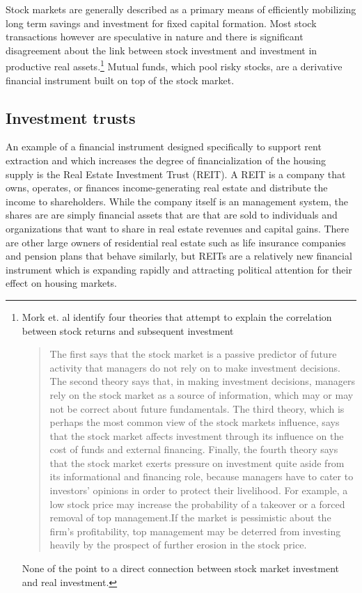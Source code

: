 Stock markets are  generally described as a primary means of efficiently mobilizing long term savings and investment for  fixed capital formation.\cite{azfarMarketMobilizedCapital2003} Most stock transactions however are speculative in nature and there is significant disagreement about the link between stock investment and investment in productive real assets.\footnote{Mork et. al \cite{morckStockMarketInvestment1990} identify four theories that attempt to explain the correlation between stock returns and subsequent investment \begin{quotation}The first says that the stock market is a passive predictor of future activity that managers do not rely on to make investment decisions. The second theory says that, in making investment decisions, managers rely on the stock market as a source of information, which may or may not be correct about future fundamentals. The third theory, which is perhaps the most common view of the stock markets influence, says that the stock market affects investment through its influence on the cost of funds and external financing. Finally, the fourth theory says that the stock market exerts pressure on investment quite aside from its informational and financing role, because managers have to cater to investors' opinions in order to protect their livelihood. For example, a low stock price may increase the probability of a takeover or a forced removal of top management.If the market is pessimistic about the firm's profitability, top management may be deterred from investing heavily by the prospect of further erosion in the stock  price.\end{quotation} None of the point to a direct connection between stock market investment and real investment.}  Mutual funds, which pool risky stocks, are a derivative  financial instrument built on top of the stock market.


\subsection{Investment trusts}
An example of a financial instrument designed specifically to support rent extraction and which  increases the degree of financialization of the housing supply is the  Real Estate Investment Trust (REIT).  A REIT is a company that owns, operates, or finances income-generating real estate and distribute the income to shareholders. While the company itself is an management system, the shares are are simply financial assets that are that are sold to individuals and organizations that want to share in real estate revenues and capital gains. There are other large owners of residential real estate such as life insurance companies and pension plans that behave similarly, but REITs are a relatively new financial instrument which is  expanding rapidly and attracting political attention for their effect on housing markets.  %

